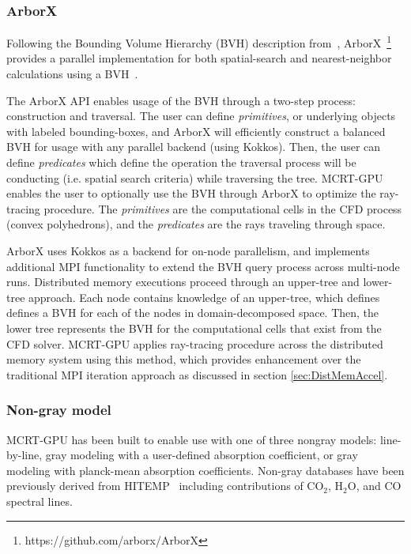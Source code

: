 \subsubsection{ArborX}
Following the Bounding Volume Hierarchy (BVH) description from~\citet{Karras2012MaximizingTrees}, ArborX~\footnote{https://github.com/arborx/ArborX} provides a parallel implementation for both spatial-search and nearest-neighbor calculations using a BVH~\cite{Lebrun-Grandie2019ArborX:Library}.

The ArborX API enables usage of the BVH through a two-step process: construction and traversal. The user can define \textit{primitives}, or underlying objects with labeled bounding-boxes, and ArborX will efficiently construct a balanced BVH for usage with any parallel backend (using Kokkos). Then, the user can define \textit{predicates} which define the operation the traversal process will be conducting (i.e. spatial search criteria) while traversing the tree.
MCRT-GPU enables the user to optionally use the BVH through ArborX to optimize the ray-tracing procedure. The \textit{primitives} are the computational cells in the CFD process (convex polyhedrons), and the \textit{predicates} are the rays traveling through space.

ArborX uses Kokkos as a backend for on-node parallelism, and implements additional MPI functionality to extend the BVH query process across multi-node runs. Distributed memory executions proceed through an upper-tree and lower-tree approach.
Each node contains knowledge of an upper-tree, which defines defines a BVH for each of the nodes in domain-decomposed space. Then, the lower tree represents the BVH for the computational cells that exist from the CFD solver. 
MCRT-GPU applies ray-tracing procedure across the distributed memory system using this method, which provides enhancement over the traditional MPI iteration approach as discussed in section \ref{sec:DistMemAccel}.

\subsubsection{Non-gray model}
MCRT-GPU has been built to enable use with one of three nongray models: line-by-line, gray modeling with a user-defined absorption coefficient, or gray modeling with planck-mean absorption coefficients. Non-gray databases have been previously derived from HITEMP~\cite{Rothman2010HITEMPDatabase} including contributions of CO$_2$, H$_2$O, and CO spectral lines.


